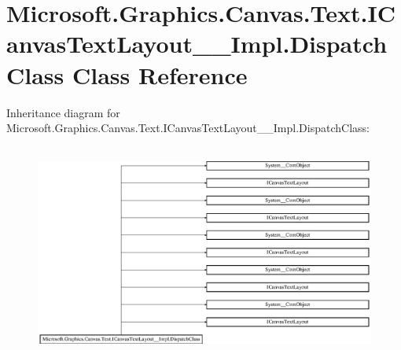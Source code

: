 \hypertarget{class_microsoft_1_1_graphics_1_1_canvas_1_1_text_1_1_i_canvas_text_layout_____impl_1_1_dispatch_class}{}\section{Microsoft.\+Graphics.\+Canvas.\+Text.\+I\+Canvas\+Text\+Layout\+\_\+\+\_\+\+Impl.\+Dispatch\+Class Class Reference}
\label{class_microsoft_1_1_graphics_1_1_canvas_1_1_text_1_1_i_canvas_text_layout_____impl_1_1_dispatch_class}
Inheritance diagram for Microsoft.\+Graphics.\+Canvas.\+Text.\+I\+Canvas\+Text\+Layout\+\_\+\+\_\+\+Impl.\+Dispatch\+Class\+:\begin{figure}[H]
\begin{center}
\leavevmode
\includegraphics[height=7.113164cm]{class_microsoft_1_1_graphics_1_1_canvas_1_1_text_1_1_i_canvas_text_layout_____impl_1_1_dispatch_class}
\end{center}
\end{figure}
